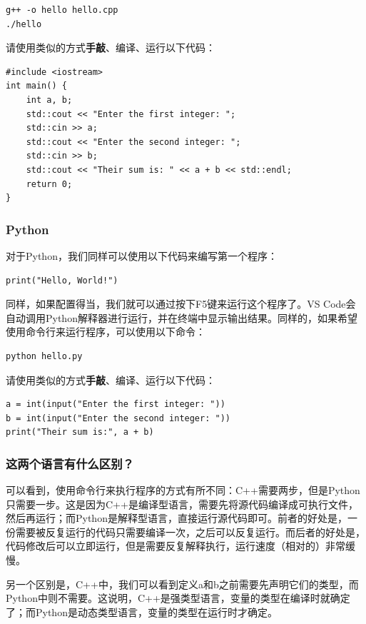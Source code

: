 \documentclass[../main.tex]{subfiles}
\begin{document}
\begin{verbatim}
g++ -o hello hello.cpp
./hello
\end{verbatim}

请使用类似的方式\textbf{手敲}、编译、运行以下代码：

\begin{verbatim}
#include <iostream>
int main() {
    int a, b;
    std::cout << "Enter the first integer: ";
    std::cin >> a;
    std::cout << "Enter the second integer: ";
    std::cin >> b;
    std::cout << "Their sum is: " << a + b << std::endl;
    return 0;
}
\end{verbatim}

\subsubsection{Python}

对于Python，我们同样可以使用以下代码来编写第一个程序：

\begin{verbatim}
print("Hello, World!")
\end{verbatim}

同样，如果配置得当，我们就可以通过按下F5键来运行这个程序了。VS Code会自动调用Python解释器进行运行，并在终端中显示输出结果。同样的，如果希望使用命令行来运行程序，可以使用以下命令：

\begin{verbatim}
python hello.py
\end{verbatim}

请使用类似的方式\textbf{手敲}、编译、运行以下代码：

\begin{verbatim}
a = int(input("Enter the first integer: "))
b = int(input("Enter the second integer: "))
print("Their sum is:", a + b)
\end{verbatim}

\subsubsection{这两个语言有什么区别？}

可以看到，使用命令行来执行程序的方式有所不同：C++需要两步，但是Python只需要一步。这是因为C++是编译型语言，需要先将源代码编译成可执行文件，然后再运行；而Python是解释型语言，直接运行源代码即可。前者的好处是，一份需要被反复运行的代码只需要编译一次，之后可以反复运行。而后者的好处是，代码修改后可以立即运行，但是需要反复解释执行，运行速度（相对的）非常缓慢。

另一个区别是，C++中，我们可以看到定义a和b之前需要先声明它们的类型，而Python中则不需要。这说明，C++是强类型语言，变量的类型在编译时就确定了；而Python是动态类型语言，变量的类型在运行时才确定。
\end{document}
